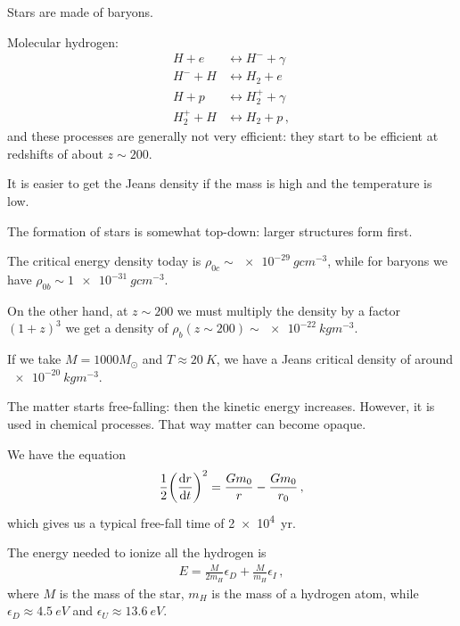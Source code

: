 \documentclass[main.tex]{subfiles}
\begin{document}


Stars are made of baryons. 

Molecular hydrogen: 
%
\begin{subequations}
\begin{align}
  H + e &\leftrightarrow H^{-} + \gamma  \\
  H^{-} + H &\leftrightarrow H_2 + e  \\
   H+ p &\leftrightarrow H_2^{+} + \gamma  \\
  H_2^{+} + H &\leftrightarrow H_2 + p
\,,
\end{align}
\end{subequations}
%
and these processes are generally not very efficient: they start to be efficient at redshifts of about \(z \sim 200\). 

It is easier to get the Jeans density if the mass is high and the temperature is low. 

The formation of stars is somewhat top-down: larger structures form first. 

The critical energy density today is  \(\rho_{0c} \sim \SI{e-29}{g cm^{-3}}\), while for baryons we have \(\rho_{0b} \sim \SI{1e-31}{g cm^{-3}}\). 

On the other hand, at \(z \sim 200 \) we must multiply the density by a factor \((1+z)^3\) we get a density of \(\rho_{b} (z \sim 200) \sim \SI{e-22}{kg m^{-3}}\). 

If we take \(M = 1000 M_{\odot}\) and \(T \approx \SI{20}{K}\), we have a Jeans critical density of around \(\SI{e-20}{kg m^{-3}}\). 


The matter starts free-falling: then the kinetic energy increases. 
However, it is used in chemical processes. That way matter can become opaque. 

We have the equation 
%
\begin{align}
  \frac{1}{2} \qty(\dv{r}{t})^2 = \frac{G m_0 }{r} - \frac{G m_0 }{r_0 }
\,,
\end{align}
%
which gives us a typical free-fall time of \SI{2e4}{yr}. 

The energy needed to ionize all the hydrogen is 
%
\begin{align}
  E = \frac{M}{2 m_H} \epsilon_{D} + \frac{M}{m_H} \epsilon_{I}
\,,
\end{align}
%
where \(M\) is the mass of the star, \(m_H\) is the mass of a hydrogen atom, while \(\epsilon_{D} \approx \SI{4.5}{eV}\) and \(\epsilon_{U} \approx \SI{13.6}{eV}\). 
\end{document}
